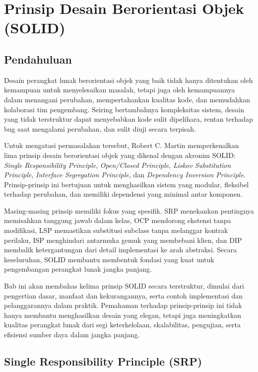 \chapter{Prinsip Desain Berorientasi Objek (SOLID)}

\section{Pendahuluan}

Desain perangkat lunak berorientasi objek yang baik tidak hanya ditentukan oleh kemampuan untuk menyelesaikan masalah, tetapi juga oleh kemampuannya dalam menangani perubahan, mempertahankan kualitas kode, dan memudahkan kolaborasi tim pengembang. Seiring bertambahnya kompleksitas sistem, desain yang tidak terstruktur dapat menyebabkan kode sulit dipelihara, rentan terhadap bug saat mengalami perubahan, dan sulit diuji secara terpisah.

Untuk mengatasi permasalahan tersebut, Robert C. Martin memperkenalkan lima prinsip desain berorientasi objek yang dikenal dengan akronim SOLID: \textit{Single Responsibility Principle}, \textit{Open/Closed Principle}, \textit{Liskov Substitution Principle}, \textit{Interface Segregation Principle}, dan \textit{Dependency Inversion Principle}. Prinsip-prinsip ini bertujuan untuk menghasilkan sistem yang modular, fleksibel terhadap perubahan, dan memiliki dependensi yang minimal antar komponen.

Masing-masing prinsip memiliki fokus yang spesifik. SRP menekankan pentingnya memisahkan tanggung jawab dalam kelas, OCP mendorong ekstensi tanpa modifikasi, LSP memastikan substitusi subclass tanpa melanggar kontrak perilaku, ISP menghindari antarmuka gemuk yang membebani klien, dan DIP membalik ketergantungan dari detail implementasi ke arah abstraksi. Secara keseluruhan, SOLID membantu membentuk fondasi yang kuat untuk pengembangan perangkat lunak jangka panjang.

Bab ini akan membahas kelima prinsip SOLID secara terstruktur, dimulai dari pengertian dasar, manfaat dan kekurangannya, serta contoh implementasi dan pelanggarannya dalam praktik. Pemahaman terhadap prinsip-prinsip ini tidak hanya membantu menghasilkan desain yang elegan, tetapi juga meningkatkan kualitas perangkat lunak dari segi keterkelolaan, skalabilitas, pengujian, serta efisiensi sumber daya dalam jangka panjang.


\section{Single Responsibility Principle (SRP)}

